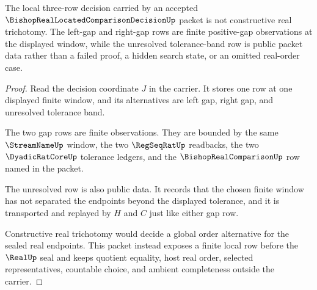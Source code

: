 \begin{theorem}
\label{thm:bishop-real-located-comparison-decision-window-trichotomy-refusal}
The local three-row decision carried by an accepted $\BishopRealLocatedComparisonDecisionUp$ packet is not constructive real trichotomy. The left-gap and right-gap rows are finite positive-gap observations at the displayed window, while the unresolved tolerance-band row is public packet data rather than a failed proof, a hidden search state, or an omitted real-order case.
\end{theorem}
\begin{proof}
Read the decision coordinate $J$ in the carrier. It stores one row at one displayed finite window, and its alternatives are left gap, right gap, and unresolved tolerance band.

The two gap rows are finite observations. They are bounded by the same $\StreamNameUp$ window, the two $\RegSeqRatUp$ readbacks, the two $\DyadicRatCoreUp$ tolerance ledgers, and the $\BishopRealComparisonUp$ row named in the packet.

The unresolved row is also public data. It records that the chosen finite window has not separated the endpoints beyond the displayed tolerance, and it is transported and replayed by $H$ and $C$ just like either gap row.

Constructive real trichotomy would decide a global order alternative for the sealed real endpoints. This packet instead exposes a finite local row before the $\RealUp$ seal and keeps quotient equality, host real order, selected representatives, countable choice, and ambient completeness outside the carrier.
\end{proof}

